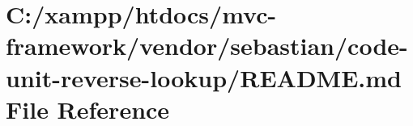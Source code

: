 \hypertarget{vendor_2sebastian_2code-unit-reverse-lookup_2_r_e_a_d_m_e_8md}{}\section{C\+:/xampp/htdocs/mvc-\/framework/vendor/sebastian/code-\/unit-\/reverse-\/lookup/\+R\+E\+A\+D\+ME.md File Reference}
\label{vendor_2sebastian_2code-unit-reverse-lookup_2_r_e_a_d_m_e_8md}
